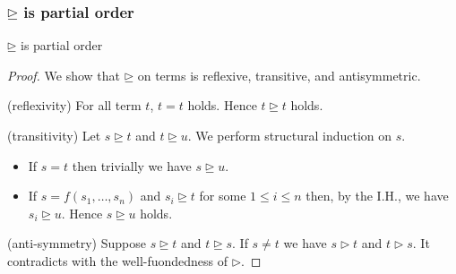 \documentclass[12pt,aspectratio=169]{beamer}
\begin{document}
\begin{frame}
    \frametitle{$\unrhd$ is partial order}

    \begin{lemma}
        $\unrhd$ is partial order
    \end{lemma}

    \begin{proof}
        We show that $\unrhd$ on terms is reflexive, transitive, and antisymmetric.

        (reflexivity) For all term $t$, $t = t$ holds. Hence $t \unrhd t$ holds.

        (transitivity) Let $s \unrhd t$ and $t \unrhd u$. We perform structural induction on $s$.
        \begin{itemize}
            \item If $s = t$ then trivially we have $s \unrhd u$.
            \item If $s = f(s_1, \dots, s_n)$ and $s_i \unrhd t$ for some $1 \leq i \leq n$ then, 
            by the I.H., we have $s_i \unrhd u$. Hence $s \unrhd u$ holds.
        \end{itemize}

        (anti-symmetry) Suppose $s \unrhd t$ and $t \unrhd s$. If $s \neq t$ we have $s \rhd t$ and $t \rhd s$.
        It contradicts with the well-fuondedness of $\rhd$.
    \end{proof}
\end{frame}
\end{document}
